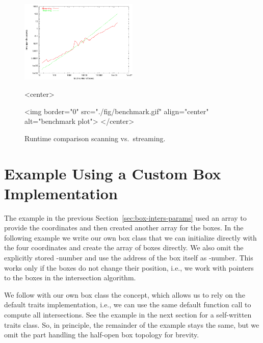 \begin{figure}[htbp]
\begin{ccTexOnly}
\begin{center}
  \includegraphics[width=0.5\textwidth]{Box_intersection_d/fig/benchmark}
\end{center}
\end{ccTexOnly}
\begin{ccHtmlOnly}
<center>
\end{ccHtmlOnly}
  \caption{Runtime comparison scanning vs.\ streaming.
  \label{fig_benchmark}}

\begin{ccHtmlOnly}
<img border="0" src="./fig/benchmark.gif" align="center" alt="benchmark plot">
</center>
\end{ccHtmlOnly}
\end{figure}

\section{Example Using a Custom Box Implementation}

The example in the previous Section~\ref{sec:box-inters-params} used
an array to provide the coordinates and then created another array for
the boxes. In the following example we write our own box class
 that we can initialize directly with the four coordinates and
create the array of boxes directly. We also omit the explicitly stored
-number and use the address of the box itself as
-number. This works only if the boxes do not change their
position, i.e., we work with pointers to the boxes in the intersection
algorithm.

We follow with our own box class  the
 concept, which allows us to rely on the
default traits implementation, i.e., we can use the same default
function call to compute all intersections. See the example in the
next section for a self-written traits class. So, in principle, the
remainder of the example stays the same, but we omit the part handling
the half-open box topology for brevity.

